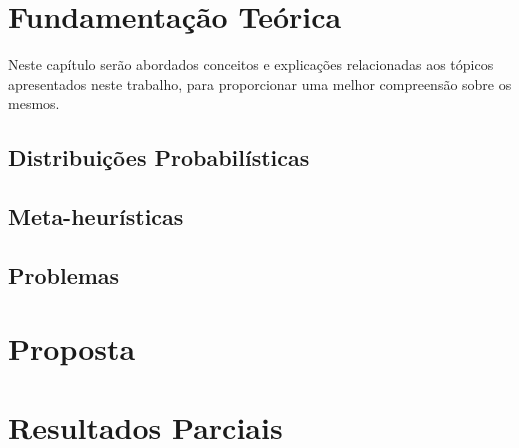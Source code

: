 \setlength\abovedisplayskip{0pt} \setlength\belowdisplayskip{0pt}
\setlength\abovedisplayshortskip{0pt} \setlength\belowdisplayshortskip{0pt}

\chapter{Fundamentação Teórica} \label{cap1}
Neste capítulo serão abordados conceitos e explicações relacionadas aos tópicos apresentados neste trabalho, para proporcionar uma melhor compreensão sobre os mesmos.

\section{Distribuições Probabilísticas}

\section{Meta-heurísticas}

\section{Problemas}

\chapter{Proposta} \label{cap2}


\chapter{Resultados Parciais} \label{cap3}

